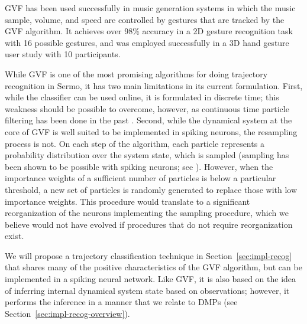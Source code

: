GVF has been used successfully
in music generation systems
in which the music sample,
volume, and speed are
controlled by gestures
that are tracked by the GVF algorithm.
It achieves over 98\% accuracy
in a 2D gesture recognition task
with 16 possible gestures,
and was employed successfully
in a 3D hand gesture user study
with 10 participants.

While GVF is one of the most promising
algorithms for doing trajectory recognition
in Sermo,
it has two main limitations in its current formulation.
First, while the classifier can be used online,
it is formulated in discrete time;
this weakness should be possible to overcome,
however, as continuous time particle filtering
has been done in the past
\citep{ng2005}.
Second, while the dynamical system
at the core of GVF is well suited
to be implemented in spiking neurons,
the resampling process is not.
On each step of the algorithm,
each particle represents a probability
distribution over the system state,
which is sampled
(sampling has been shown to be
possible with spiking neurons;
see \citealt{buesing2011}).
However, when the importance weights
of a sufficient number of particles
is below a particular threshold,
a new set of particles
is randomly generated
to replace those with low importance weights.
This procedure would translate to
a significant reorganization
of the neurons implementing
the sampling procedure,
which we believe
would not have evolved if
procedures that do not require
reorganization exist.

We will propose a trajectory classification technique
in Section~\ref{sec:impl-recog}
that shares many of the positive
characteristics of the GVF algorithm,
but can be implemented in a spiking neural network.
Like GVF, it is also based on the idea
of inferring internal dynamical system state
based on observations;
however, it performs the inference
in a manner that we relate to
DMPs (see Section~\ref{sec:impl-recog-overview}).
